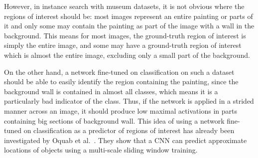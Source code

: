 However, in instance search with museum datasets, it is not obvious
where the regions of interest should be: most images represent an entire
painting or parts of it and only some may contain the painting as part
of the image with a wall in the background. This means for most images,
the ground-truth region of interest is simply the entire image, and some
may have a ground-truth region of interest which is almost the entire image,
excluding only a small part of the background.

On the other hand, a network fine-tuned on classification on such a dataset
should be able to easily identify the region containing the painting, since
the background wall is contained in almost all classes, which means it is a
particularly bad indicator of the class. Thus, if the network is applied in
a strided manner across an image, it should produce low maximal activations
in parts containing big sections of background wall. This idea of using a
network fine-tuned on classification as a predictor of regions of interest
has already been investigated by Oquab et al.~\cite{oquab_is_2015}. They
show that a CNN can predict approximate locations of objects using a
multi-scale sliding window training.

